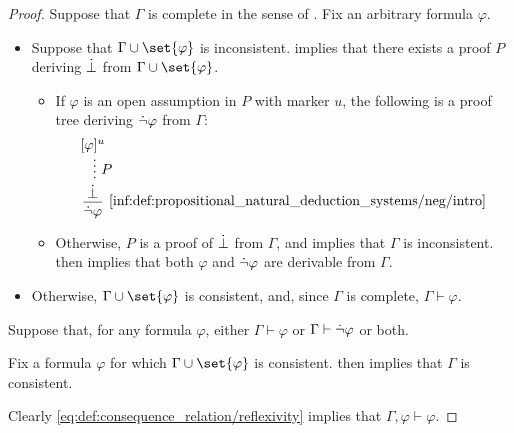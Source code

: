 \begin{proof}
  \SufficiencySubProof Suppose that \( \Gamma \) is complete in the sense of . Fix an arbitrary formula \( \varphi \).

  \begin{itemize}
    \item Suppose that \( \Gamma \cup \set{ \varphi } \) is inconsistent.  implies that there exists a proof \( P \) deriving \( \dot{\bot} \) from \( \Gamma \cup \set{ \varphi } \).

    \begin{itemize}
      \item If \( \varphi \) is an open assumption in \( P \) with marker \( u \), the following is a proof tree deriving \( \dot{\neg} \varphi \) from \( \Gamma \):
      \begin{equation*}
        \begin{prooftree}
          \hypo{ [\varphi]^u }
          \ellipsis { \( P \) } { \synbot }
          \infer1[\ref{inf:def:propositional_natural_deduction_systems/neg/intro}]{ \synneg \varphi }.
        \end{prooftree}
      \end{equation*}

      \item Otherwise, \( P \) is a proof of \( \dot{\bot} \) from \( \Gamma \), and  implies that \( \Gamma \) is inconsistent.  then implies that both \( \varphi \) and \( \dot{\neg} \varphi \) are derivable from \( \Gamma \).
    \end{itemize}

    \item Otherwise, \( \Gamma \cup \set{ \varphi } \) is consistent, and, since \( \Gamma \) is complete, \( \Gamma \vdash \varphi \).
  \end{itemize}

  \NecessitySubProof Suppose that, for any formula \( \varphi \), either \( \Gamma \vdash \varphi \) or \( \Gamma \vdash \dot{\neg} \varphi \) or both.

  Fix a formula \( \varphi \) for which \( \Gamma \cup \set{ \varphi } \) is consistent.  then implies that \( \Gamma \) is consistent.

  Clearly \eqref{eq:def:consequence_relation/reflexivity} implies that \( \Gamma, \varphi \vdash \varphi \).


\end{proof}
